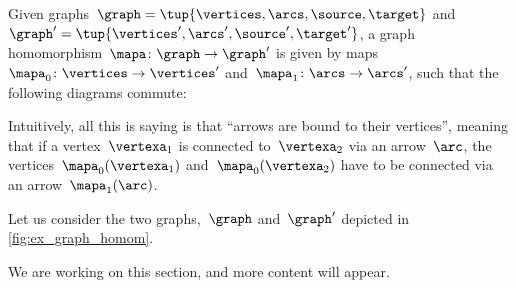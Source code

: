 

\section{}

\begin{definition}
    \label{def:graph_homom}
    Given graphs~$\graph=\tup{\vertices,\arcs,\source,\target}$ and~$\graph'=\tup{\vertices',\arcs',\source',\target'}$, a graph homomorphism~$\mapa \colon \graph \to \graph'$ is given by maps~$\mapa_0\colon \vertices \to \vertices'$ and~$\mapa_1\colon \arcs \to \arcs'$, such that the following diagrams commute:
    \begin{center}
    \end{center}
\end{definition}
\begin{remark}
    Intuitively, all this is saying is that ``arrows are bound to their vertices'', meaning that if a vertex~$\vertexa_1$ is connected to~$\vertexa_2$ via an arrow~$\arc$, the vertices~$\mapa_0(\vertexa_1)$ and~$\mapa_0(\vertexa_2)$ have to be connected via an arrow~$\mapa_1(\arc)$.
\end{remark}

\begin{example}
    Let us consider the two graphs,~$\graph$ and~$\graph'$ depicted in \cref{fig:ex_graph_homom}.

    \begin{figure}[h]
        \begin{center}
        \end{center}
    \end{figure}
    \label{fig:ex_graph_homom}
\end{example}

\begin{example}[Counterexample]
\end{example}


We are working on this section, and more content will appear.

